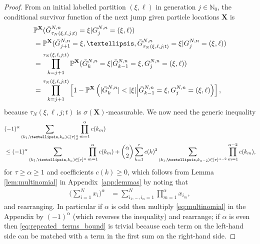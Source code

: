\documentclass[a4paper,11pt]{article}
\theoremstyle{definition}
\newcommand{\bbP}{\mathbb{P}}
\newcommand{\bbN}{\mathbb{N}}
\newcommand{\bfX}{\mathbf{X}}
\begin{document}
\begin{proof}
From an initial labelled partition $( \xi, \ell )$ in generation $j \in \bbN_0$, the conditional survivor function of the next jump given particle locations $\bfX$ is
\begin{align}
&\bbP^{ \bfX }(  \bar{ G }_{ \tau_N( \xi, \ell, j; t ) }^{ N, n } = \xi | G_j^{ N, n } = ( \xi, \ell ) ) \notag \\
&= \bbP^{ \bfX }( \bar{ G }_{ j + 1 }^{ N, n } = \xi, \ldots, \bar{ G }_{ \tau_N( \xi, \ell, j; t ) }^{ N, n } = \xi | G_j^{ N, n } = ( \xi, \ell ) ) \notag \\
&= \prod_{ k = j + 1 }^{ \tau_N( \xi, \ell, j; t ) } \bbP^{ \bfX }( \bar{ G }_k^{ N, n } = \xi | \bar{ G }_{ k - 1 }^{ N, n } = \xi, G_j^{ N, n } = ( \xi, \ell ) ) \notag \\
&= \prod_{ k = j + 1 }^{ \tau_N( \xi, \ell, j; t ) } \left[ 1 - \bbP^{ \bfX }\left( | \bar{ G }_k^{ N, n } | < | \xi | \middle| \bar{ G }_{ k - 1 }^{ N, n } = \xi, G_j^{ N, n } = ( \xi, \ell ) \right) \right], \label{survivor_function_ub}
\end{align}
because $\tau_N(\xi, \ell, j; t)$ is $\sigma(\bfX)$-measurable.
We now need the generic inequality
\begin{align}
&( - 1 )^{ \alpha } \sum_{ ( k_1, \ldots, k_{ \alpha } ) \in [ \tau ]_d^{ \alpha } } \prod_{ m = 1 }^{ \alpha } c( k_m ) \notag\\
&\leq ( - 1 )^{ \alpha }\sum_{(k_1, \ldots, k_{ \alpha }) \in[\tau]^\alpha}  \prod_{ m = 1 }^{ \alpha } c( k_m ) + \binom{ \alpha }{ 2 } \sum_{ k = 1 }^{ \tau } c( k )^2 \sum_{(k_1, \ldots, k_{ \alpha - 2 }) \in [\tau]^{\alpha-2} } \prod_{ m = 1 }^{ \alpha - 2 } c( k_m ), \label{eq:repeated_terms_bound}
\end{align}
for $\tau \geq \alpha \geq 1$ and coefficients $c( k ) \geq 0$, which follows from Lemma \ref{lem:multinomial} in Appendix~\ref{app:lemmas} by noting that
\begin{align*}
\Bigg(\sum_{i=1}^N x_i\Bigg)^\alpha &= \sum_{i_1,\dots,i_\alpha = 1}^N \prod_{m=1}^\alpha x_{i_m},
\end{align*}
and rearranging.
In particular if $\alpha$ is odd then multiply \eqref{eq:multinomial} in the Appendix by $(-1)^\alpha$ (which reverses the inequality) and rearrange; if $\alpha$ is even then \eqref{eq:repeated_terms_bound} is trivial because each term on the left-hand side can be matched with a term in the first sum on the right-hand side.


\end{proof}
\end{document}

